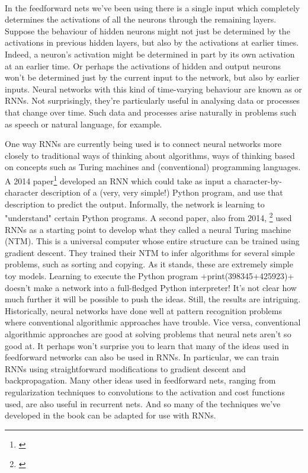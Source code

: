 {\paragraph{} In the feedforward nets we've been using there is a single input which completely determines the activations of all the neurons through the remaining layers. Suppose the behaviour of hidden neurons might not just be determined by the activations in previous hidden layers, but also by the activations at earlier times. Indeed, a neuron's activation might be determined in part by its own activation at an earlier time.  Or perhaps the activations of hidden and output neurons won't be determined just by the current input to the network, but also by earlier inputs. Neural networks with this kind of time-varying behaviour are known as  or RNNs. Not surprisingly, they're particularly useful in analysing data or processes that change over time. Such data and processes arise naturally in problems such as speech or natural language, for example.

One way RNNs are currently being used is to connect neural networks more closely to traditional ways of thinking about algorithms, ways of thinking based on concepts such as Turing machines and (conventional) programming languages. A 2014 paper\footnote{\href{http://arxiv.org/abs/1410.4615}{}} developed an RNN which could take as input a character-by-character description of a (very, very simple!) Python program, and use that description to predict the output. Informally, the network is learning to "understand" certain Python programs. A second paper, also from 2014, \footnote{\href{http://arxiv.org/abs/1410.5401}{}} used RNNs as a starting point to develop what they called a neural Turing machine (NTM). This is a universal computer whose entire structure can be trained using gradient descent. They trained their NTM to infer algorithms for several simple problems, such as sorting and copying. As it stands, these are extremely simple toy models. Learning to execute the Python program \cd+print(398345+425923)+ doesn't make a network into a full-fledged Python interpreter! It's not clear how much further it will be possible to push the ideas. Still, the results are intriguing. Historically, neural networks have done well at pattern recognition problems where conventional algorithmic approaches have trouble. Vice versa, conventional algorithmic approaches are good at solving problems that neural nets aren't so good at. It perhaps won't surprise you to learn that many of the ideas used in feedforward networks can also be used in RNNs. In particular, we can train RNNs using straightforward modifications to gradient descent and backpropagation. Many other ideas used in feedforward nets, ranging from regularization techniques to convolutions to the activation and cost functions used, are also useful in recurrent nets. And so many of the techniques we've developed in the book can be adapted for use with RNNs.

}

